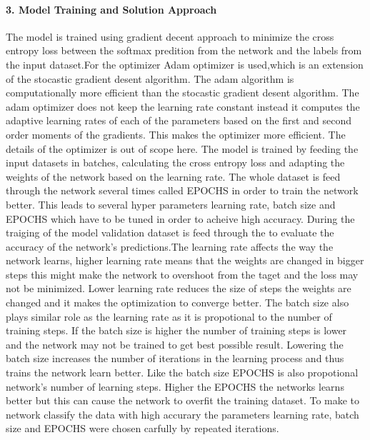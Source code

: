 \documentclass[11pt]{article}
\begin{document}
\paragraph{3. Model Training and Solution
Approach}\label{model-training-and-solution-approach}

The model is trained using gradient decent approach to minimize the
cross entropy loss between the softmax predition from the network and
the labels from the input dataset.For the optimizer Adam optimizer is
used,which is an extension of the stocastic gradient desent algorithm.
The adam algorithm is computationally more efficient than the stocastic
gradient desent algorithm. The adam optimizer does not keep the learning
rate constant instead it computes the adaptive learning rates of each of
the parameters based on the first and second order moments of the
gradients. This makes the optimizer more efficient. The details of the
optimizer is out of scope here. The model is trained by feeding the
input datasets in batches, calculating the cross entropy loss and
adapting the weights of the network based on the learning rate. The
whole dataset is feed through the network several times called EPOCHS in
order to train the network better. This leads to several hyper
parameters learning rate, batch size and EPOCHS which have to be tuned
in order to acheive high accuracy. During the traiging of the model
validation dataset is feed through the to evaluate the accuracy of the
network's predictions.The learning rate affects the way the network
learns, higher learning rate means that the weights are changed in
bigger steps this might make the network to overshoot from the taget and
the loss may not be minimized. Lower learning rate reduces the size of
steps the weights are changed and it makes the optimization to converge
better. The batch size also plays similar role as the learning rate as
it is propotional to the number of training steps. If the batch size is
higher the number of training steps is lower and the network may not be
trained to get best possible result. Lowering the batch size increases
the number of iterations in the learning process and thus trains the
network learn better. Like the batch size EPOCHS is also propotional
network's number of learning steps. Higher the EPOCHS the networks
learns better but this can cause the network to overfit the training
dataset. To make to network classify the data with high accurary the
parameters learning rate, batch size and EPOCHS were chosen carfully by
repeated iterations.
\end{document}

